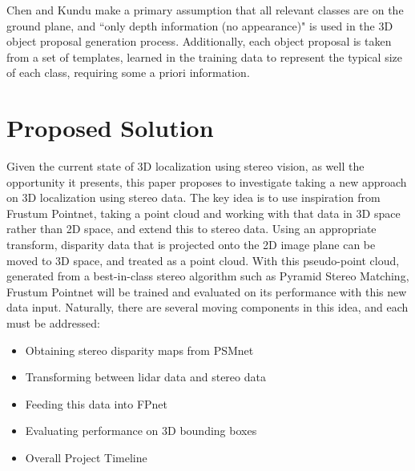 Chen and Kundu \cite{DBLP:journals/corr/ChenKZMFU16} make a primary assumption that all relevant classes are on the ground plane, and ``only depth information (no appearance)" is used in the 3D object proposal generation process. Additionally, each object proposal is taken from a set of templates, learned in the training data to represent the typical size of each class, requiring some a priori information.

\section{Proposed Solution}

Given the current state of 3D localization using stereo vision, as well the opportunity it presents, this paper proposes to investigate taking a new approach on 3D localization using stereo data. The key idea is to use inspiration from Frustum Pointnet, taking a point cloud and working with that data in 3D space rather than 2D space, and extend this to stereo data. Using an appropriate transform, disparity data that is projected onto the 2D image plane can be moved to 3D space, and treated as a point cloud. With this pseudo-point cloud, generated from a best-in-class stereo algorithm such as Pyramid Stereo Matching, Frustum Pointnet will be trained and evaluated on its performance with this new data input. 
Naturally, there are several moving components in this idea, and each must be addressed: 
\begin{itemize}\itemsep=-0.5em
    \item Obtaining stereo disparity maps from PSMnet
    \item Transforming between lidar data and stereo data
    \item Feeding this data into FPnet
    \item Evaluating performance on 3D bounding boxes
    \item Overall Project Timeline
\end{itemize}

